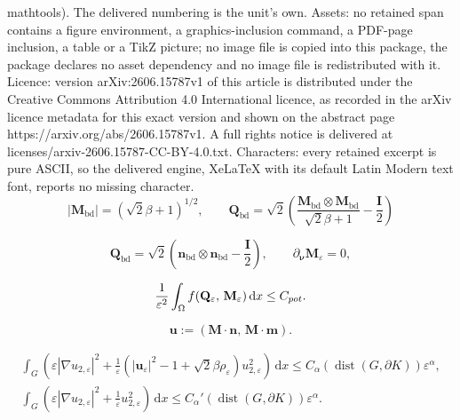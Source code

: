 \documentclass[10pt,a4paper]{amsart}
\DeclareMathOperator{\dist}{dist}                                   %
\newcommand{\Cpot}{{\rm C}_{\rm pot}}
\newcommand{\I}{\mathbf{I}}
\newcommand{\Mb}{\M_{\mathrm{bd}}}
\newcommand{\M}{\mathbf{M}}
\newcommand{\Qb}{\Q_{\mathrm{bd}}}
\newcommand{\Q}{\mathbf{Q}}
\newcommand{\abs}[1]{\left| #1 \right|}                             %
\newcommand{\eps}{\varepsilon}
\newcommand{\m}{\mathbf{m}}
\newcommand{\nb}{\n_{\mathrm{bd}}}
\newcommand{\nnu}{{\boldsymbol{\nu}}}
\newcommand{\n}{\mathbf{n}}
\renewcommand{\d}{\mathrm{d}}
\renewcommand{\u}{\mathbf{u}}
\begin{document}
mathtools). The delivered numbering is the unit's own. Assets: no retained span contains a figure environment, a graphics-inclusion command, a PDF-page inclusion, a table or a TikZ picture; no image file is copied into this package, the package declares no asset dependency and no image file is redistributed with it. Licence: version arXiv:2606.15787v1 of this article is distributed under the Creative Commons Attribution 4.0 International licence, as recorded in the arXiv licence metadata for this exact version and shown on the abstract page https://arxiv.org/abs/2606.15787v1. A full rights notice is delivered at licenses/arxiv-2606.15787-CC-BY-4.0.txt. Characters: every retained excerpt is pure ASCII, so the delivered engine, XeLaTeX with its default Latin Modern text font, reports no missing character.
\begin{equation}\label{hp:bc-dir}
    \abs{\Mb} = \left(\sqrt{2}\beta + 1 \right)^{1/2}, \qquad
    \Qb = \sqrt{2}\left(\frac{\Mb \otimes \Mb}{\sqrt{2}\beta + 1} - \frac{\I}{2}\right) 
\end{equation}

\begin{equation}\label{hp:bc-mixed}
    \Qb = \sqrt{2}\left( \nb \otimes \nb - \frac{\I}{2} \right), \qquad 
    \partial_\nnu \M_\eps = 0,
\end{equation}

\begin{equation}\label{hp:equibdd-f}
    \frac{1}{\eps^2} \int_\Omega f(\Q_\eps,\,\M_\eps) \,{\d}x \leq \Cpot.
\end{equation}

\begin{equation}\label{eq:u}
   \u := \left(\M\cdot \n,\,\M\cdot \m\right). 
\end{equation}

    \begin{gather}
        \int_G \left( \eps \abs{\nabla u_{2,\eps}}^2 + \frac{1}{\eps}\left(\abs{\u_\eps}^2 - 1 + \sqrt{2}\beta \rho_\eps \right) u_{2,\eps}^2 \right)\,{\d}x \leq C_\alpha(\dist(G, \partial K)) \eps^\alpha, \label{eq:decay-u2-goal1} \\ 
        \int_G \left( \eps \abs{\nabla u_{2,\eps}}^2 + \frac{1}{\eps} u_{2,\eps}^2 \right)\,{\d}x \leq C_\alpha'(\dist(G, \partial K)) \eps^\alpha \label{eq:decay-u2-goal2}.
    \end{gather}
\end{document}

